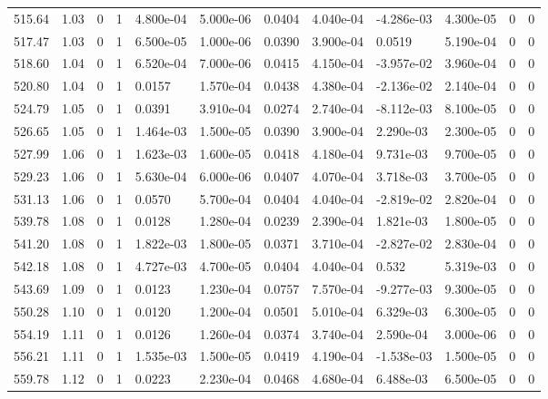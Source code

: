 \documentclass[preview]{standalone}
\begin{document}
{{{{{{{{{{{{{{{{\begin{tabular}{L{1.2cm}C{1.2cm} C{0.3cm}C{0.5cm} C{1.4cm}C{1.4cm} C{1.4cm}C{1.4cm} C{1.6cm}C{1.6cm} C{1.6cm}C{1.6cm}}
  515.64  &  1.03  & 0     &  1 &  4.800e-04  & 5.000e-06  &  0.0404&   4.040e-04& -4.286e-03 & 4.300e-05   &  0 & 0  \\ 
  517.47  &  1.03  & 0     &  1 &  6.500e-05  & 1.000e-06  &  0.0390&   3.900e-04& 0.0519 & 5.190e-04   &  0 & 0  \\ 
  518.60  &  1.04  & 0     &  1 &  6.520e-04  & 7.000e-06  &  0.0415&   4.150e-04& -3.957e-02 & 3.960e-04   &  0 & 0  \\ 
  520.80  &  1.04  & 0     &  1 &  0.0157  & 1.570e-04  &  0.0438&   4.380e-04& -2.136e-02 & 2.140e-04   &  0 & 0  \\ 
  524.79  &  1.05  & 0     &  1 &  0.0391  & 3.910e-04  &  0.0274&   2.740e-04& -8.112e-03 & 8.100e-05   &  0 & 0  \\ 
  526.65  &  1.05  & 0     &  1 &  1.464e-03  & 1.500e-05  &  0.0390&   3.900e-04& 2.290e-03 & 2.300e-05   &  0 & 0  \\ 
  527.99  &  1.06  & 0     &  1 &  1.623e-03  & 1.600e-05  &  0.0418&   4.180e-04& 9.731e-03 & 9.700e-05   &  0 & 0  \\ 
  529.23  &  1.06  & 0     &  1 &  5.630e-04  & 6.000e-06  &  0.0407&   4.070e-04& 3.718e-03 & 3.700e-05   &  0 & 0  \\ 
  531.13  &  1.06  & 0     &  1 &  0.0570  & 5.700e-04  &  0.0404&   4.040e-04& -2.819e-02 & 2.820e-04   &  0 & 0  \\ 
  539.78  &  1.08  & 0     &  1 &  0.0128  & 1.280e-04  &  0.0239&   2.390e-04& 1.821e-03 & 1.800e-05   &  0 & 0  \\ 
  541.20  &  1.08  & 0     &  1 &  1.822e-03  & 1.800e-05  &  0.0371&   3.710e-04& -2.827e-02 & 2.830e-04   &  0 & 0  \\ 
  542.18  &  1.08  & 0     &  1 &  4.727e-03  & 4.700e-05  &  0.0404&   4.040e-04& 0.532 & 5.319e-03   &  0 & 0  \\ 
  543.69  &  1.09  & 0     &  1 &  0.0123  & 1.230e-04  &  0.0757&   7.570e-04& -9.277e-03 & 9.300e-05   &  0 & 0  \\ 
  550.28  &  1.10  & 0     &  1 &  0.0120  & 1.200e-04  &  0.0501&   5.010e-04& 6.329e-03 & 6.300e-05   &  0 & 0  \\ 
  554.19  &  1.11  & 0     &  1 &  0.0126  & 1.260e-04  &  0.0374&   3.740e-04& 2.590e-04 & 3.000e-06   &  0 & 0  \\ 
  556.21  &  1.11  & 0     &  1 &  1.535e-03  & 1.500e-05  &  0.0419&   4.190e-04& -1.538e-03 & 1.500e-05   &  0 & 0  \\ 
  559.78  &  1.12  & 0     &  1 &  0.0223  & 2.230e-04  &  0.0468&   4.680e-04& 6.488e-03 & 6.500e-05   &  0 & 0  \\ 

\end{tabular}}}}}}}}}}}}}}}}}
\end{document}
